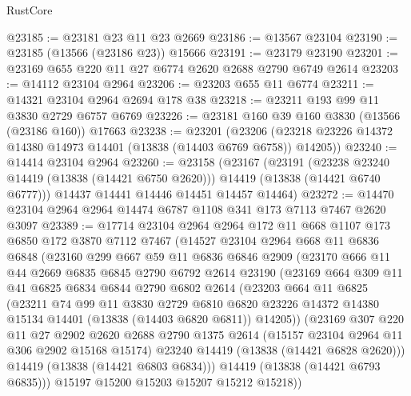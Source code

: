 \begin{lexlean}{RustCore}
\begin{coremodule}
@23185 := @23181 @23 @11 @23 @2669
@23186 := @13567 @23104
@23190 := @23185 (@13566 (@23186 @23)) @15666
@23191 := @23179 @23190
@23201 := @23169 @655 @220 @11 @27 @6774 @2620 @2688 @2790 @6749 @2614
@23203 := @14112 @23104 @2964
@23206 := @23203 @655 @11 @6774
@23211 := @14321 @23104 @2964 @2694 @178 @38
@23218 := @23211 @193 @99 @11 @3830 @2729 @6757 @6769
@23226 := @23181 @160 @39 @160 @3830 (@13566 (@23186 @160)) @17663
@23238 := @23201
    (@23206 (@23218 @23226 @14372 @14380 @14973 @14401 (@13838 (@14403 @6769 @6758)) @14205))
@23240 := @14414 @23104 @2964
@23260 := @23158
    (@23167
      (@23191
        (@23238 @23240 @14419 (@13838 (@14421 @6750 @2620)))
        @14419
        (@13838 (@14421 @6740 @6777)))
      @14437
      @14441
      @14446
      @14451
      @14457
      @14464)
@23272 := @14470 @23104 @2964 @2964 @14474 @6787 @1108 @341 @173 @7113 @7467 @2620 @3097
@23389 := @17714
    @23104
    @2964
    @2964
    @172
    @11
    @668
    @1107
    @173
    @6850
    @172
    @3870
    @7112
    @7467
    (@14527
      @23104
      @2964
      @668
      @11
      @6836
      @6848
      (@23160
        @299
        @667
        @59
        @11
        @6836
        @6846
        @2909
        (@23170
          @666
          @11
          @44
          @2669
          @6835
          @6845
          @2790
          @6792
          @2614
          @23190
          (@23169
            @664
            @309
            @11
            @41
            @6825
            @6834
            @6844
            @2790
            @6802
            @2614
            (@23203
              @664
              @11
              @6825
              (@23211
                @74
                @99
                @11
                @3830
                @2729
                @6810
                @6820
                @23226
                @14372
                @14380
                @15134
                @14401
                (@13838 (@14403 @6820 @6811))
                @14205))
            (@23169
              @307
              @220
              @11
              @27
              @2902
              @2620
              @2688
              @2790
              @1375
              @2614
              (@15157 @23104 @2964 @11 @306 @2902 @15168 @15174)
              @23240
              @14419
              (@13838 (@14421 @6828 @2620)))
            @14419
            (@13838 (@14421 @6803 @6834)))
          @14419
          (@13838 (@14421 @6793 @6835)))
        @15197
        @15200
        @15203
        @15207
        @15212
        @15218))

\end{coremodule}
\end{lexlean}
